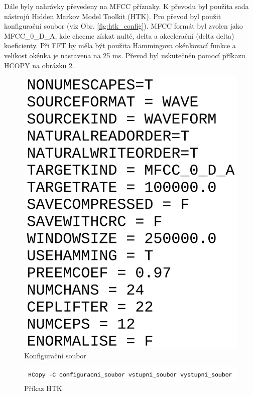 \documentclass[FM,BP]{tulthesis}
\begin{document}
Dále byly nahrávky převedeny na MFCC příznaky. K převodu byl použita sada nástrojů Hidden Markov Model Toolkit (HTK). Pro převod byl použit konfigurační soubor (viz Obr. \ref{fig:htk_confiģ}). MFCC formát byl zvolen jako MFCC\_0\_D\_A, kde chceme získat nulté, delta a akcelerační (delta delta) koeficienty. Při FFT by měla být použita Hammingova okénkovací funkce a velikost okénka je nastavena na 25 ms. Převod byl uskutečněn pomocí příkazu HCOPY na obrázku \ref{fig:htk}.

\begin{figure}[htbp]
\centerline{\includegraphics[scale=.2,keepaspectratio]{htk_config.png}}
\caption{Konfigurační soubor}
\label{fig:htk_config}
\end{figure}
\FloatBarrier

\begin{figure}[htbp]
\centerline{\includegraphics[width=\textwidth,height=\textheight,keepaspectratio]{htk_command.png}}
\caption{Příkaz HTK}
\label{fig:htk}
\end{figure}
\FloatBarrier
\end{document}

